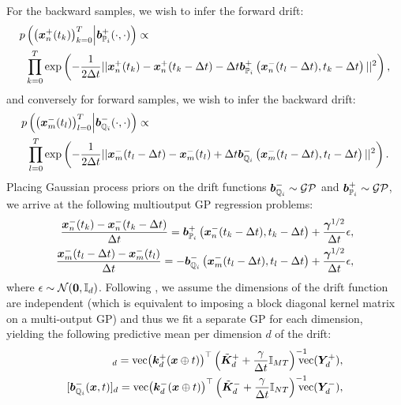 \documentclass[a4paper,12pt,twoside,openright]{report}
\theoremstyle{definition}
\begin{document}
For the backward samples, we wish to infer the forward drift:
\begin{align*}
    p&\left( \big({\bm{x}}^{+}_n(t_k)\big)_{k=0}^T  \Big| {\bm{b}}^{+}_{{\mathbb{P}}_{i}}(\cdot, \cdot)\right) \propto\\
    &\prod_{k=0}^T \exp \left( -\frac{1}{2\Delta t} ||{\bm{x}}^{+}_n(t_k) - {\bm{x}}^{+}_n(t_k - \Delta t) -  \Delta t{\bm{b}}^{+}_{{\mathbb{P}}_{i}}\left({\bm{x}}^{-}_n(t_l - \Delta t), t_k - \Delta t\right) ||^2 \right), 
\end{align*}
and conversely for forward samples, we wish to infer the backward drift:
\begin{align*}
    p&\left(\big({\bm{x}}^{-}_m(t_l)\big)_{l=0}^T \Big| {\bm{b}}^{-}_{{\mathbb{Q}}_{i}}(\cdot, \cdot)\right) \propto\\
    &\prod_{l=0}^T \exp \left( -\frac{1}{2\Delta t} ||{\bm{x}}^{-}_m(t_l - \Delta t)  - {\bm{x}}^{-}_m(t_l)  +  \Delta t{\bm{b}}^{-}_{{\mathbb{Q}}_{i}}\left({\bm{x}}^{-}_m(t_l - \Delta t), t_l - \Delta t\right) ||^2 \right).
\end{align*}
Placing Gaussian process priors on the drift functions ${\bm{b}}^{-}_{{\mathbb{Q}}_{i}} \sim \mathcal{GP} $ and ${\bm{b}}^{+}_{{\mathbb{P}}_{i}} \sim \mathcal{GP} $, we arrive at the following multioutput GP regression problems:
\begin{align*}
        \frac{{\bm{x}}^{-}_n(t_k) - {\bm{x}}^{-}_n(t_k - \Delta t)}{\Delta t} = {\bm{b}}^{+}_{{\mathbb{P}}_{i}}\left({\bm{x}}^{-}_n(t_k - \Delta t), t_k - \Delta t\right) +\frac{\bm{\gamma}^{1/2}}{\Delta t}\epsilon ,\\
        \frac{{\bm{x}}^{-}_m(t_l - \Delta t)  - {\bm{x}}^{-}_m(t_l)}{\Delta t}  = -{\bm{b}}^{-}_{{\mathbb{Q}}_{i}}\left({\bm{x}}^{-}_m(t_l - \Delta t), t_l - \Delta t\right) +\frac{\bm{\gamma}^{1/2}}{\Delta t}\epsilon,
\end{align*}
where $\epsilon \sim {\mathcal{N}}({\bm{0}}, {\mathbb{I}_d})$. Following \citep{ruttor2013approximate, batz2018approximate}, we assume the dimensions of the drift function are independent (which is equivalent to imposing a block diagonal kernel matrix on a multi-output GP) and thus we fit a separate GP for each dimension, yielding the following predictive mean per dimension $d$ of the drift:
\begin{align}
[\bar{\vb}^{+}_{\P_{i}}(\vx, t)]_d = \vec\big(\vk_d^{+}(\vx \oplus t)\big)^{\top} \left(\tilde{\mK}_d^{+} + \frac{\gamma}{\Delta t} \mathbb{I}_{MT}\right)^{-1}\!\!\!\!\!\!\vec(\mY_d^{+}), \\
[\vb^{-}_{\Q_{i}}(\vx, t)]_d = \vec\big(\vk_d^{-}(\vx \oplus t)\big)^{\top} \left(\tilde{\mK}_d^{-} + \frac{\gamma}{\Delta t} \mathbb{I}_{NT}\right)^{-1}\!\!\!\!\!\!\vec(\mY_d^{-}) ,
\end{align}
\end{document}
